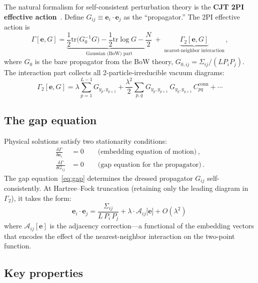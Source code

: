 \documentclass[11pt]{article}
\newcommand{\ee}{\bm{e}}
\begin{document}
The natural formalism for self-consistent perturbation theory is the \textbf{CJT 2PI effective action}~\cite{cjt1974}. Define $G_{ij} \equiv \ee_i \cdot \ee_j$ as the ``propagator.'' The 2PI effective action is
\begin{equation}\label{eq:2PI}
    \Gamma[\ee, G] = \underbrace{\frac{1}{2}\mathrm{tr}\big(G_0^{-1} G\big) - \frac{1}{2}\mathrm{tr}\log G - \frac{N}{2}}_{\text{Gaussian (BoW) part}} \;+\; \underbrace{\Gamma_2[\ee, G]}_{\text{nearest-neighbor interaction}}\,,
\end{equation}
where $G_0$ is the bare propagator from the BoW theory, $G_{0,ij} = \Sigma_{ij}/(L P_i P_j)$. The interaction part collects all 2-particle-irreducible vacuum diagrams:
\begin{equation}\label{eq:Gamma2}
    \Gamma_2[\ee, G] = \lambda \sum_{p=1}^{L-1} G_{y_p, y_{p+1}} + \frac{\lambda^2}{2} \sum_{p,q} G_{y_p, y_{p+1}}\, G_{y_q, y_{q+1}}\, C_{pq}^{\text{conn}} + \cdots
\end{equation}

\subsection{The gap equation}

Physical solutions satisfy two stationarity conditions:
\begin{align}
    \frac{\delta \Gamma}{\delta \ee_i} &= 0 \qquad \text{(embedding equation of motion)}\,, \label{eq:eom-e} \\[4pt]
    \frac{\delta \Gamma}{\delta G_{ij}} &= 0 \qquad \text{(gap equation for the propagator)}\,. \label{eq:gap}
\end{align}
The gap equation~\eqref{eq:gap} determines the dressed propagator $G_{ij}$ self-consistently. At Hartree--Fock truncation (retaining only the leading diagram in $\Gamma_2$), it takes the form:
\begin{equation}\label{eq:gap-explicit}
    \boxed{\;\ee_i \cdot \ee_j = \frac{\Sigma_{ij}}{L\, P_i\, P_j} + \lambda \cdot \mathcal{A}_{ij}\big[\ee\big] + O(\lambda^2)\;\,}
\end{equation}
where $\mathcal{A}_{ij}[\ee]$ is the adjacency correction---a functional of the embedding vectors that encodes the effect of the nearest-neighbor interaction on the two-point function.

\subsection{Key properties}
\end{document}
